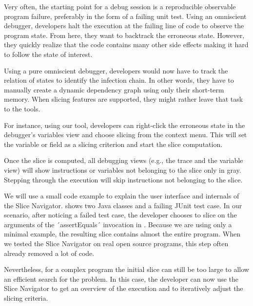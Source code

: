 Very often, the starting point for a debug session is a reproducible observable program failure, preferably in the form of a failing unit test.
Using an omniscient debugger, developers halt the execution at the failing line of code to observe the program state.
From here, they want to backtrack the erroneous state.
However, they quickly realize that the code contains many other side effects making it hard to follow the state of interest.

Using a pure omniscient debugger, developers would now have to track the relation of states to identify the infection chain. 
In other words, they have to manually create a dynamic dependency graph using only their short-term memory. 
When slicing features are supported, they might rather leave that task to the tools.

For instance, using our tool, developers can right-click the erroneous state in the debugger's variables view and choose slicing from the context menu.
This will set the variable or field as a slicing criterion and start the slice computation.

Once the slice is computed, all debugging views (e.g., the trace and the variable view) will show instructions or variables not belonging to the slice only in gray.
Stepping through the execution will skip instructions not belonging to the slice.

We will use a small code example to explain the user interface and internals of the Slice Navigator. 
 shows two Java classes and a failing JUnit test case.
In our scenario, after noticing a failed test case, the developer chooses to slice on the arguments of the ´assertEquals´ invocation in .
Because we are using only a minimal example, the resulting slice contains almost the entire program.
When we tested the Slice Navigator on real open source programs, this step often already removed a lot of code.

Nevertheless, for a complex program the initial slice can still be too large to allow an efficient search for the problem.
In this case, the developer can now use the Slice Navigator to get an overview of the execution and to iteratively adjust the slicing criteria.

